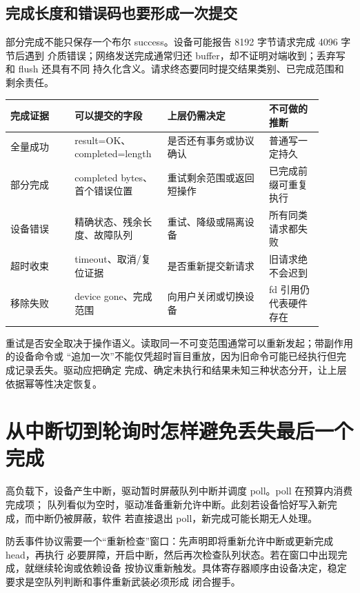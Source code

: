 \subsection{完成长度和错误码也要形成一次提交}

部分完成不能只保存一个布尔 success。设备可能报告 8192 字节请求完成 4096 字节后遇到
介质错误；网络发送完成通常归还 buffer，却不证明对端收到；丢弃写和 flush 还具有不同
持久化含义。请求终态要同时提交结果类别、已完成范围和剩余责任。

\begin{longtable}{|L{0.19\linewidth}|L{0.25\linewidth}|L{0.3\linewidth}|L{0.16\linewidth}|}
\hline
完成证据 & 可以提交的字段 & 上层仍需决定 & 不可做的推断 \\ \hline
全量成功 & result=OK、completed=length & 是否还有事务或协议确认 & 普通写一定持久 \\\tablerowrule
部分完成 & completed bytes、首个错误位置 & 重试剩余范围或返回短操作 & 已完成前缀可重复执行 \\\tablerowrule
设备错误 & 精确状态、残余长度、故障队列 & 重试、降级或隔离设备 & 所有同类请求都失败 \\\tablerowrule
超时收束 & timeout、取消/复位证据 & 是否重新提交新请求 & 旧请求绝不会迟到 \\\tablerowrule
移除失败 & device gone、完成范围 & 向用户关闭或切换设备 & fd 引用仍代表硬件存在 \\ \hline
\end{longtable}

重试是否安全取决于操作语义。读取同一不可变范围通常可以重新发起；带副作用的设备命令或
“追加一次”不能仅凭超时盲目重放，因为旧命令可能已经执行但完成记录丢失。驱动应把确定
完成、确定未执行和结果未知三种状态分开，让上层依据幂等性决定恢复。

\section{从中断切到轮询时怎样避免丢失最后一个完成}

高负载下，设备产生中断，驱动暂时屏蔽队列中断并调度 poll。poll 在预算内消费完成项；
队列看似为空时，驱动准备重新允许中断。此刻若设备恰好写入新完成，而中断仍被屏蔽，软件
若直接退出 poll，新完成可能长期无人处理。

防丢事件协议需要一个“重新检查”窗口：先声明即将重新允许中断或更新完成 head，再执行
必要屏障，开启中断，然后再次检查队列状态。若在窗口中出现完成，就继续轮询或依赖设备
按协议重新触发。具体寄存器顺序由设备决定，稳定要求是空队列判断和事件重新武装必须形成
闭合握手。

